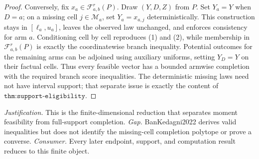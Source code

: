\documentclass{article}
\begin{document}
\begin{proof}
Conversely, fix \(x_a\in\mathcal F_{a,b}^r(P)\).  Draw \((Y,D,Z)\) from \(P\).  Set \(Y_a=Y\) when \(D=a\); on a missing cell \(j\in\mathcal M_a\), set \(Y_a=x_{a,j}\) deterministically.  This construction stays in \([\ell_a,u_a]\), leaves the observed law unchanged, and enforces consistency for arm \(a\).  Conditioning cell by cell reproduces (1) and (2), while membership in \(\mathcal F_{a,b}^r(P)\) is exactly the coordinatewise branch inequality.  Potential outcomes for the remaining arms can be adjoined using auxiliary uniforms, setting \(Y_D=Y\) on their factual cells.  Thus every feasible vector has a bounded armwise completion with the required branch score inequalities.  The deterministic missing laws need not have interval support; that separate issue is exactly the content of \(\texttt{thm:support-eligibility}\).
\end{proof}
\par\smallskip\noindent \textit{Justification.} This is the finite-dimensional reduction that separates moment feasibility from full-support completion. \textit{Gap.} BanKedagni2022 derives valid inequalities but does not identify the missing-cell completion polytope or prove a converse. \textit{Consumer.} Every later endpoint, support, and computation result reduces to this finite object.
\end{document}

